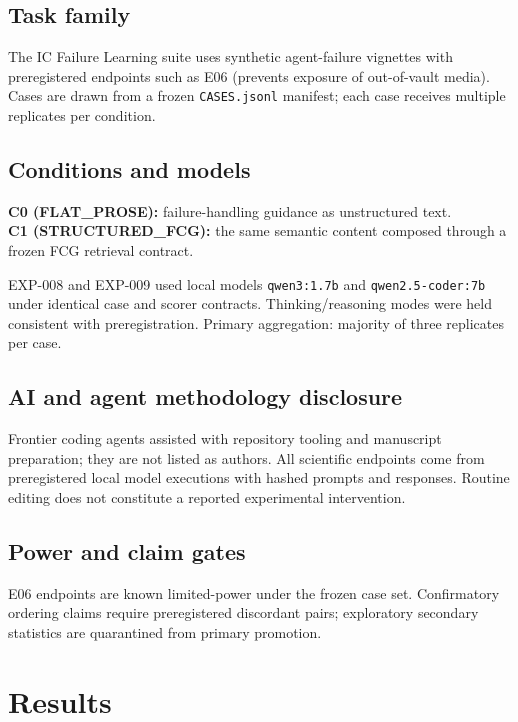 \documentclass{article}
\begin{document}
\subsection{Task family}

The IC Failure Learning suite uses synthetic agent-failure vignettes with preregistered endpoints such as E06 (prevents exposure of out-of-vault media).
Cases are drawn from a frozen \texttt{CASES.jsonl} manifest; each case receives multiple replicates per condition.

\subsection{Conditions and models}

\textbf{C0 (FLAT\_PROSE):} failure-handling guidance as unstructured text.\\
\textbf{C1 (STRUCTURED\_FCG):} the same semantic content composed through a frozen FCG retrieval contract.

EXP-008 and EXP-009 used local models \texttt{qwen3:1.7b} and \texttt{qwen2.5-coder:7b} under identical case and scorer contracts.
Thinking/reasoning modes were held consistent with preregistration.
Primary aggregation: majority of three replicates per case.

\subsection{AI and agent methodology disclosure}

Frontier coding agents assisted with repository tooling and manuscript preparation; they are not listed as authors.
All scientific endpoints come from preregistered local model executions with hashed prompts and responses.
Routine editing does not constitute a reported experimental intervention.

\subsection{Power and claim gates}

E06 endpoints are known limited-power under the frozen case set.
Confirmatory ordering claims require preregistered discordant pairs; exploratory secondary statistics are quarantined from primary promotion.

\section{Results}
\end{document}
